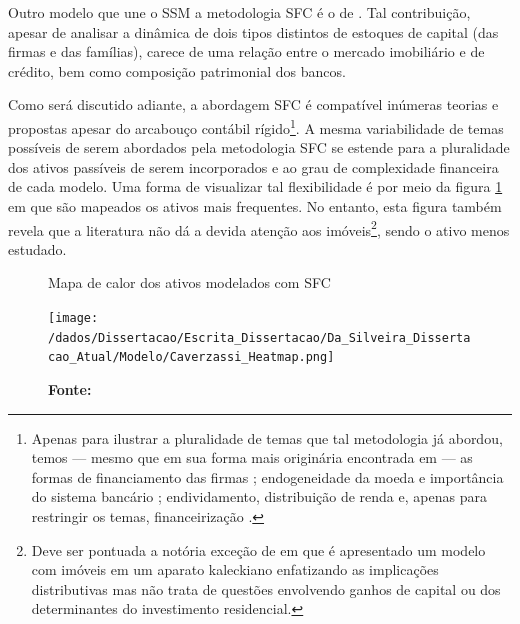 Outro modelo que une o SSM a metodologia SFC é o de \textcite{da_silveira_investimento_2019}. Tal contribuição, apesar de analisar a dinâmica de dois tipos distintos de estoques de capital (das firmas e das famílias), carece de uma relação entre o mercado imobiliário e de crédito, bem como composição patrimonial dos bancos.


Como será discutido adiante, a abordagem SFC é compatível inúmeras teorias e propostas apesar do arcabouço contábil rígido\footnote{Apenas para ilustrar a pluralidade de temas que tal metodologia já abordou, temos --- mesmo que em sua forma mais originária encontrada em \textcite{godley_macroeconomics_1983} --- as formas de financiamento das firmas \cites{asimakopulos_kalecki_1983}{skott_finance_1988}{messori_financing_1991}; endogeneidade da moeda e importância do sistema bancário \cites{messori_financing_1991}{dow_horizontalism:_1996}{arestis_theoretical_1996}{godley_money_1999}; endividamento, distribuição de renda e, apenas para restringir os temas, financeirização \cites{palley_inside_1996}{wolfson_irving_1996}{palley_money_1997}{palley_financial_2002}{dos_santos_revisiting_2009}{palley_inside_2010}{hein_finance-dominated_2012}.}. 
A mesma variabilidade de temas possíveis de serem abordados pela metodologia SFC se estende para a pluralidade dos ativos passíveis de serem incorporados e ao grau de complexidade financeira de cada modelo. Uma forma de visualizar tal flexibilidade é por meio da figura \ref{Heatmap} em que são mapeados os ativos mais frequentes. No entanto, esta figura também revela que a literatura não dá a devida atenção aos imóveis\footnote{Deve ser pontuada a notória exceção de \textcite{zezza_u.s._2008} em que é apresentado um modelo com imóveis em um aparato kaleckiano enfatizando as implicações distributivas mas não trata de questões envolvendo ganhos de capital ou dos determinantes do investimento residencial.}, sendo o ativo menos estudado. 



\begin{figure}[htb]
	\centering
	\caption{Mapa de calor dos ativos modelados com SFC}
	\label{Heatmap}
	\texttt{[image: /dados/Dissertacao/Escrita\_Dissertacao/Da\_Silveira\_Dissertacao\_Atual/Modelo/Caverzassi\_Heatmap.png]}
	\caption*{\textbf{Fonte:} \textcite[p.~4]{caverzasi_stock-flow_2013}}
\end{figure}



